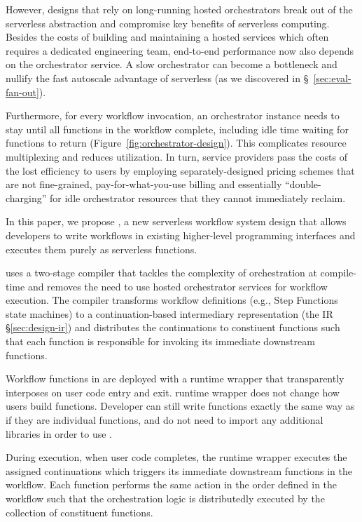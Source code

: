 However, designs that rely on long-running hosted orchestrators break out of
the serverless abstraction and compromise key benefits of serverless
computing. Besides the costs of building and maintaining a hosted services
which often requires a dedicated engineering team, end-to-end performance now
also depends on the orchestrator service. A slow orchestrator can become a
bottleneck and nullify the fast autoscale advantage of serverless (as we
discovered in \S~\ref{sec:eval-fan-out}).

Furthermore, for every workflow invocation, an orchestrator instance needs to
stay until all functions in the workflow complete, including idle time waiting
for functions to return (Figure~\ref{fig:orchestrator-design}). This
complicates resource multiplexing and reduces utilization. In turn, service
providers pass the costs of the lost efficiency to users by employing
separately-designed pricing schemes that are not fine-grained,
pay-for-what-you-use billing and essentially ``double-charging'' for idle
orchestrator resources that they cannot immediately reclaim.

In this paper, we propose \name{}, a new serverless workflow system design
that allows developers to write workflows in existing higher-level programming
interfaces and executes them purely as serverless functions.

\name{} uses a two-stage compiler that tackles the complexity of orchestration
at compile-time and removes the need to use hosted orchestrator services for
workflow execution. The compiler transforms workflow definitions (e.g., Step
Functions state machines) to a continuation-based intermediary representation
(the \name{} IR \S\ref{sec:design-ir}) and distributes the continuations to
constiuent functions such that each function is responsible for invoking its
immediate downstream functions.

Workflow functions in \name{} are deployed with a runtime wrapper that
transparently interposes on user code entry and exit. \name{} runtime wrapper
does not change how users build functions. Developer can still write functions
exactly the same way as if they are individual functions, and do not need to
import any additional libraries in order to use \name{}.

During execution, when user code completes, the runtime wrapper executes the
assigned continuations which triggers its immediate downstream functions in
the workflow. Each function performs the same action in the order defined in
the workflow such that the orchestration logic is distributedly executed by
the collection of constituent functions.

